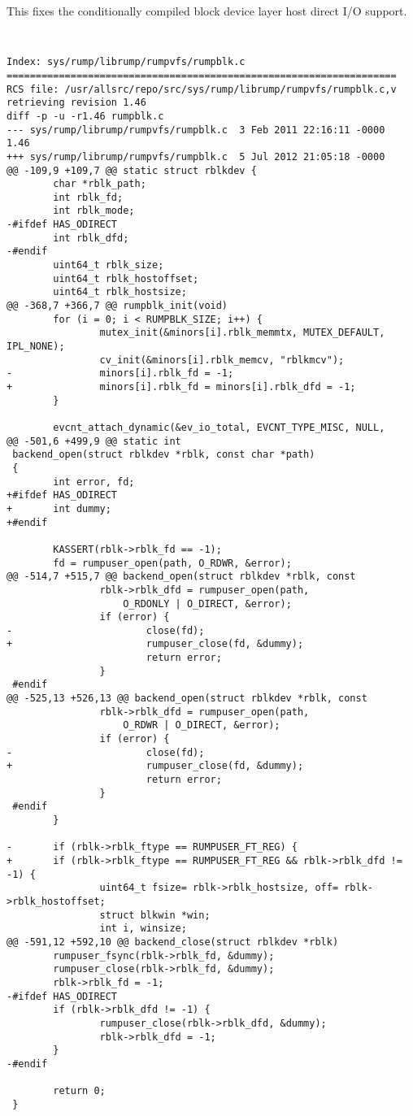 This fixes the conditionally compiled block device layer host direct
I/O support.

{\tt \scriptsize
\begin{verbatim}
Index: sys/rump/librump/rumpvfs/rumpblk.c
===================================================================
RCS file: /usr/allsrc/repo/src/sys/rump/librump/rumpvfs/rumpblk.c,v
retrieving revision 1.46
diff -p -u -r1.46 rumpblk.c
--- sys/rump/librump/rumpvfs/rumpblk.c  3 Feb 2011 22:16:11 -0000       1.46
+++ sys/rump/librump/rumpvfs/rumpblk.c  5 Jul 2012 21:05:18 -0000
@@ -109,9 +109,7 @@ static struct rblkdev {
        char *rblk_path;
        int rblk_fd;
        int rblk_mode;
-#ifdef HAS_ODIRECT
        int rblk_dfd;
-#endif
        uint64_t rblk_size;
        uint64_t rblk_hostoffset;
        uint64_t rblk_hostsize;
@@ -368,7 +366,7 @@ rumpblk_init(void)
        for (i = 0; i < RUMPBLK_SIZE; i++) {
                mutex_init(&minors[i].rblk_memmtx, MUTEX_DEFAULT, IPL_NONE);
                cv_init(&minors[i].rblk_memcv, "rblkmcv");
-               minors[i].rblk_fd = -1;
+               minors[i].rblk_fd = minors[i].rblk_dfd = -1;
        }

        evcnt_attach_dynamic(&ev_io_total, EVCNT_TYPE_MISC, NULL,
@@ -501,6 +499,9 @@ static int
 backend_open(struct rblkdev *rblk, const char *path)
 {
        int error, fd;
+#ifdef HAS_ODIRECT
+       int dummy;
+#endif

        KASSERT(rblk->rblk_fd == -1);
        fd = rumpuser_open(path, O_RDWR, &error);
@@ -514,7 +515,7 @@ backend_open(struct rblkdev *rblk, const
                rblk->rblk_dfd = rumpuser_open(path,
                    O_RDONLY | O_DIRECT, &error);
                if (error) {
-                       close(fd);
+                       rumpuser_close(fd, &dummy);
                        return error;
                }
 #endif
@@ -525,13 +526,13 @@ backend_open(struct rblkdev *rblk, const
                rblk->rblk_dfd = rumpuser_open(path,
                    O_RDWR | O_DIRECT, &error);
                if (error) {
-                       close(fd);
+                       rumpuser_close(fd, &dummy);
                        return error;
                }
 #endif
        }

-       if (rblk->rblk_ftype == RUMPUSER_FT_REG) {
+       if (rblk->rblk_ftype == RUMPUSER_FT_REG && rblk->rblk_dfd != -1) {
                uint64_t fsize= rblk->rblk_hostsize, off= rblk->rblk_hostoffset;
                struct blkwin *win;
                int i, winsize;
@@ -591,12 +592,10 @@ backend_close(struct rblkdev *rblk)
        rumpuser_fsync(rblk->rblk_fd, &dummy);
        rumpuser_close(rblk->rblk_fd, &dummy);
        rblk->rblk_fd = -1;
-#ifdef HAS_ODIRECT
        if (rblk->rblk_dfd != -1) {
                rumpuser_close(rblk->rblk_dfd, &dummy);
                rblk->rblk_dfd = -1;
        }
-#endif

        return 0;
 }
\end{verbatim}}
